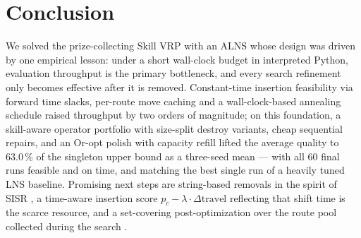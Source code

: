 \documentclass[10pt, a4paper]{article}
\begin{document}
\section{Conclusion}

We solved the prize-collecting Skill VRP with an ALNS whose design was driven
by one empirical lesson: under a short wall-clock budget in interpreted
Python, evaluation throughput is the primary bottleneck, and every search
refinement only becomes effective after it is removed. Constant-time
insertion feasibility via forward time slacks, per-route move caching and a
wall-clock-based annealing schedule raised throughput by two orders of
magnitude; on this foundation, a skill-aware operator portfolio with
size-split destroy variants, cheap sequential repairs, and an Or-opt polish
with capacity refill lifted the average quality to 63.0\,\% of the singleton
upper bound as a three-seed mean --- with all 60 final runs feasible and on
time, and matching the best single run of a heavily tuned LNS baseline.
Promising next steps are string-based removals in the spirit of SISR
\cite{christiaens2020}, a time-aware insertion score $p_c - \lambda\cdot
\Delta\mathrm{travel}$ reflecting that shift time is the scarce resource, and
a set-covering post-optimization over the route pool collected during the
search \cite{hu2014}.
\end{document}
